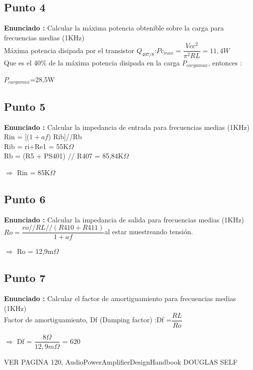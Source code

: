 \documentclass[12pt]{book}
\begin{document}
\subsection{Punto 4}
\textbf{Enunciado : } Calcular la máxima potencia obtenible sobre la carga para frecuencias medias (1KHz)\\[1cm]
Máxima potencia disipada por el transistor $Q_{407/8}$:\quad $Pc_{max}=\dfrac{Vcc^{2}}{\pi^{2}RL}=11,4W$\\[0,75cm]
Que es el 40\% de la máxima potencia disipada en la carga $P_{cargamax}$, entonces :
\begin{center}
$P_{cargamax}$=28,5W
\end{center}

\subsection{Punto 5}
\textbf{Enunciado : } Calcular la impedancia de entrada para frecuencias medias (1KHz)\\[1cm]
Rin = [($1+af$) Rib]//Rb\\
Rib = ri+Re1 = 55K$\Omega$\\
Rb = (R5 + PS401) // R407 = 85,84K$\Omega$
\begin{center}
$\Longrightarrow$  Rin = 85K$\Omega$
\end{center}

\subsection{Punto 6}
\textbf{Enunciado : } Calcular la impedancia de salida para frecuencias medias (1KHz)\\[1cm]
$Ro=\dfrac{ro//RL//(R410+R411)}{1+af}$\quad al estar muestreando tensión.
\begin{center}
$\Longrightarrow$  Ro = 12,9m$\Omega$
\end{center}

\subsection{Punto 7}
\textbf{Enunciado : } Calcular el factor de amortiguamiento para frecuencias medias (1KHz)\\[1cm]

Factor de amortiguamiento, Df (Damping factor) :\qquad Df =$\dfrac{RL}{Ro}$\\
\begin{center}
$\Longrightarrow$  Df = $\dfrac{8\Omega}{12,9m\Omega}$ = 620
\end{center}
VER PAGINA 120, AudioPowerAmplifierDesignHandbook DOUGLAS SELF
\end{document}
